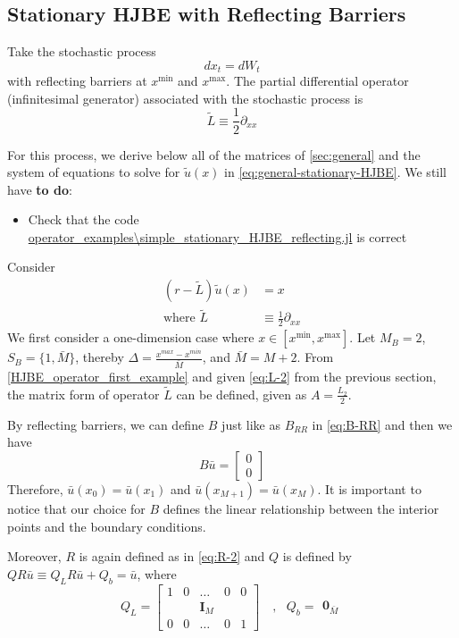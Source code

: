 \documentclass[11pt]{article}
\newcommand{\D}[1][]{\ensuremath{\partial_{#1}}}
\begin{document}
\subsection{Stationary HJBE with Reflecting Barriers}
Take the stochastic process
$$
d x_t = d W_t
$$
with reflecting barriers at $x^{\min}$ and $x^{\max}$.  The partial differential operator (infinitesimal generator) associated with the stochastic process is
$$
	\tilde{L} \equiv \frac{1}{2}\D[xx]
$$

For this process, we derive below all of the matrices of \cref{sec:general} and the system of equations to solve for $\tilde{u}(x)$ in \cref{eq:general-stationary-HJBE}. We still have \textbf{to do}:
\begin{itemize}
	\item Check that the code \url{operator_examples\simple_stationary_HJBE_reflecting.jl} is correct
\end{itemize}
Consider
\begin{align}
(r - \tilde{L} )\tilde{u}(x) &= x\label{HJBE_reflecting_barriers_PDE}\\
\text{where }\tilde{L}&\equiv \frac{1}{2}\partial_{xx}\label{HJBE_operator_first_example}
\end{align}
We first consider a one-dimension case where $x\in [x^{\min},x^{\max}]$. Let $M_B = 2$, $S_B = \{1,\bar{M}\}$, thereby $\Delta  = \frac{x^{max}-x^{min}}{\bar{M}}$, and $\bar{M} = M+2$. From \eqref{HJBE_operator_first_example} and given \eqref{eq:L-2} from the previous section, the matrix form of operator $\tilde{L}$ can be defined, given as $A = \frac{L_2}{2}$.

By reflecting barriers, we can define $B$ just like as $B_{RR}$ in \eqref{eq:B-RR} and then we have
\begin{equation}
B\bar{u} = \begin{bmatrix}
0\\
0
\end{bmatrix} \label{B_reflecting}
\end{equation}
Therefore, $\bar{u}(x_0) = \bar{u}(x_1)$ and $\bar{u}(x_{M+1}) = \bar{u}(x_M)$. It is important to notice that our choice for $B$ defines the linear relationship between the interior points and the boundary conditions.

Moreover, $R$ is again defined as in \eqref{eq:R-2} and $Q$ is defined by $Q R\bar{u}\equiv Q_L R\bar{u}+Q_b = \bar{u}$, where
\begin{equation}
Q_L = \begin{bmatrix}
1& 0&\dots&0&0\\
 & & \mathbf{I}_M & & \\
0&0&\dots&0&1
\end{bmatrix}%
\quad , \text{ } Q_b = \begin{matrix}
\mathbf{0}_{\bar{M}}
\end{matrix}\label{Q_reflecting}
\end{equation}
\end{document}
